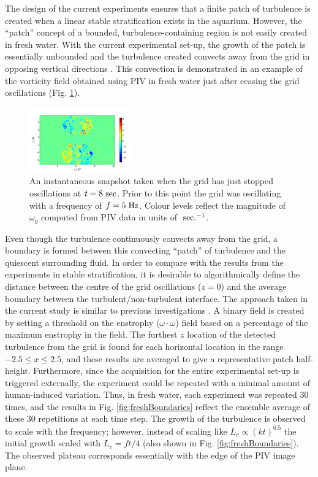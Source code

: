 \documentclass{piv13-abstract}
\newcommand{\unit}[1]{\ensuremath{\, \mathrm{\hspace{0.5mm}#1}}}
\newcommand{\figLabel}{Fig. }
\begin{document}
The design of the current experiments ensures that a finite patch of turbulence is created when a linear stable stratification exists in the aquarium. However, the ``patch'' concept of a bounded, turbulence-containing region is not easily created in fresh water. With the current experimental set-up, the growth of the patch is essentially unbounded and the turbulence created convects away from the grid in opposing vertical directions \cite{Long1978,Silva1994,Holzner2006}. This convection is demonstrated in an example of the vorticity field obtained using PIV in fresh water just after ceasing the grid oscillations (\figLabel\ref{fig:pivFreshDemo}).

\begin{figure}[ht]
\centering
\includegraphics[width=0.4\textwidth]{figures/pivFreshDemo.pdf}
\caption{An instantaneous snapshot taken when the grid has just stopped oscillations at $t=8\unit{sec}$. Prior to this point the grid was oscillating with a frequency of $f=5\unit{Hz}$. Colour levels reflect the magnitude of $\omega_y$ computed from PIV data in units of $\unit{sec.^{-1}}$. \label{fig:pivFreshDemo}}
\end{figure}

Even though the turbulence continuously convects away from the grid, a boundary is formed between this convecting ``patch'' of turbulence and the quiescent surrounding fluid. In order to compare with the results from the experiments in stable stratification, it is desirable to algorithmically define the distance between the centre of the grid oscillations ($z=0$) and the average boundary between the turbulent/non-turbulent interface. The approach taken in the current study is similar to previous investigations \cite{Holzner2006,Krug2013}. A binary field is created by setting a threshold on the enstrophy ($\omega\cdot\omega$) field based on a percentage of the maximum enstrophy in the field. The furthest $z$ location of the detected turbulence from the grid is found for each horizontal location in the range $-2.5 \le x \le 2.5$, and these results are averaged to give a representative patch half-height. Furthermore, since the acquisition for the entire experimental set-up is triggered externally, the experiment could be repeated with a minimal amount of human-induced variation. Thus, in fresh water, each experiment was repeated 30 times, and the results in \figLabel\ref{fig:freshBoundaries} reflect the ensemble average of these 30 repetitions at each time step. The growth of the turbulence is observed to scale with the frequency; however, instead of scaling like $L_v\propto (kt)^{0.5}$ \cite{Long1978,Silva1994,Holzner2006} the initial growth scaled with $L_v=ft/4$ (also shown in \figLabel\ref{fig:freshBoundaries}). The observed plateau corresponds essentially with the edge of the PIV image plane.
\end{document}
